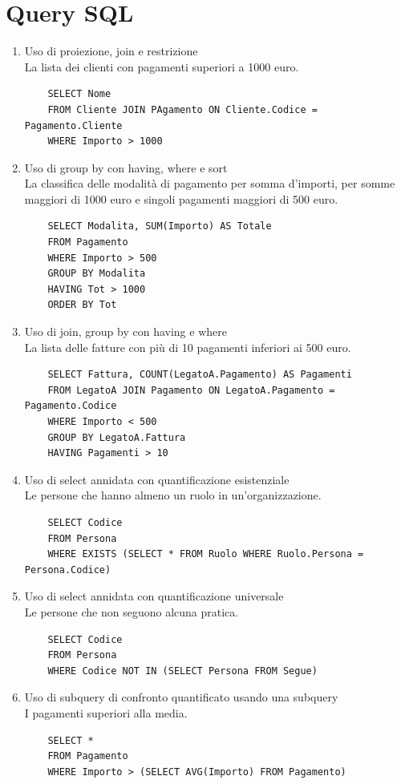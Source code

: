 \documentclass[10pt]{article}
\begin{document}
\section{Query SQL}
\begin{enumerate}
	\item Uso di proiezione, join e restrizione\\
	La lista dei clienti con pagamenti superiori a 1000 euro.
	\begin{lstlisting}
	SELECT Nome
	FROM Cliente JOIN PAgamento ON Cliente.Codice = Pagamento.Cliente
	WHERE Importo > 1000
	\end{lstlisting}
	\item Uso di group by con having, where e sort\\
	La classifica delle modalità di pagamento per somma d'importi, per somme maggiori di 1000 euro e singoli pagamenti maggiori di 500 euro.
	\begin{lstlisting}
	SELECT Modalita, SUM(Importo) AS Totale
	FROM Pagamento
	WHERE Importo > 500
	GROUP BY Modalita
	HAVING Tot > 1000
	ORDER BY Tot
	\end{lstlisting}
	\item Uso di join, group by con having e where\\
	La lista delle fatture con più di 10 pagamenti inferiori ai 500 euro.
	\begin{lstlisting}
	SELECT Fattura, COUNT(LegatoA.Pagamento) AS Pagamenti
	FROM LegatoA JOIN Pagamento ON LegatoA.Pagamento = Pagamento.Codice
	WHERE Importo < 500
	GROUP BY LegatoA.Fattura
	HAVING Pagamenti > 10
	\end{lstlisting}
	\item Uso di select annidata con quantificazione esistenziale\\
	Le persone che hanno almeno un ruolo in un'organizzazione.
	\begin{lstlisting}
	SELECT Codice
	FROM Persona
	WHERE EXISTS (SELECT * FROM Ruolo WHERE Ruolo.Persona = Persona.Codice)
	\end{lstlisting}
	\item Uso di select annidata con quantificazione universale\\
	Le persone che non seguono alcuna pratica.
	\begin{lstlisting}
	SELECT Codice
	FROM Persona
	WHERE Codice NOT IN (SELECT Persona FROM Segue)
	\end{lstlisting}
	\item Uso di subquery di confronto quantificato usando una subquery\\
	I pagamenti superiori alla media.
	\begin{lstlisting}
	SELECT *
	FROM Pagamento
	WHERE Importo > (SELECT AVG(Importo) FROM Pagamento)
	\end{lstlisting}
\end{enumerate}
\pagebreak
\end{document}
